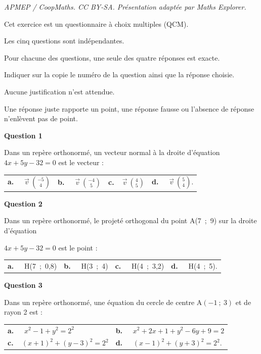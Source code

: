 \documentclass[10pt]{article}
\providecommand{\vv}[1]{\overrightarrow{#1}}
\providecommand{\vv}[1]{{\overrightarrow{#1}}}
\begin{document}
\noindent\textit{APMEP / CoopMaths. CC BY-SA. Présentation adaptée par Maths Explorer.}\par\medskip
\medskip

Cet exercice est un questionnaire à choix multiples (QCM). 

Les cinq questions sont indépendantes.

 Pour chacune des questions, une seule des quatre réponses est exacte.
 
Indiquer sur la copie le numéro de la question ainsi que la réponse choisie.

 Aucune justification n’est attendue.
 
Une réponse juste rapporte un point, une réponse fausse ou l’absence de réponse n’enlèvent pas de point.

\medskip

\textbf{Question 1} 

\medskip 

Dans un repère orthonormé, un vecteur normal à la droite d’équation $4x+5y-32=0$ est le vecteur :

\medskip

\begin{tabularx}{\linewidth}{*{4}{X}}
\textbf{a.~~} $\vv{v}\ \binom{-5}{4} $ &\textbf{b.~~} $\vv{v}\ \binom{-4}{5} $&\textbf{c.~~}$\vv{v}\ \binom{4}{5} $& \textbf{d.~~} $\vv{v}\ \binom{5}{4}  $.
\end{tabularx}

\medskip

\textbf{Question 2}

\medskip 

Dans un repère orthonormé, le projeté orthogonal du point A(7~;~9) sur la droite d’équation 

$4x+5y-32=0$ est le point :

\medskip

\begin{tabularx}{\linewidth}{*{4}{X}}
\textbf{a.~~} H(7~;~0,8)  &\textbf{b.~~} H(3~;~4)&\textbf{c.~~} H(4~;~3,2) & \textbf{d.~~}  H(4~;~5).
\end{tabularx}

\medskip

\textbf{Question 3}

\medskip 

Dans un repère orthonormé, une équation du cercle de centre A$(-1~;~3)$ et de rayon 2 est :

\medskip

\begin{tabularx}{\linewidth}{*{2}{X}}
\textbf{a.~~} $ x^2-1+y^2=2^2 $ &\textbf{b.~~} $x^2+2x+1+y^2-6y+9=2 $\\\textbf{c.~~}$(x+1)^2+(y-3)^2=2^2 $& \textbf{d.~~} $(x-1)^2+(y+3)^2=2^2  $.
\end{tabularx}
\end{document}
